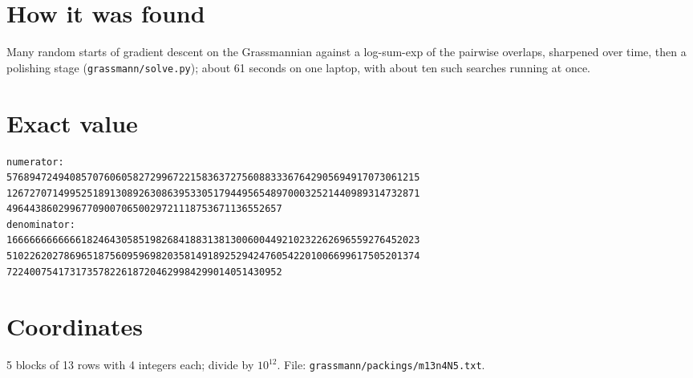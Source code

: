 \documentclass[11pt,a4paper]{article}
\begin{document}
\section{How it was found}
Many random starts of gradient descent on the Grassmannian against a log-sum-exp of the pairwise overlaps, sharpened over time, then a polishing stage (\texttt{grassmann/solve.py}); about 61 seconds on one laptop, with about ten such searches running at once.


\appendix
\section{Exact value}
{\small
\begin{verbatim}
numerator:
576894724940857076060582729967221583637275608833367642905694917073061215
126727071499525189130892630863953305179449565489700032521440989314732871
496443860299677090070650029721118753671136552657
denominator:
166666666666618246430585198268418831381300600449210232262696559276452023
510226202786965187560959698203581491892529424760542201006699617505201374
722400754173173578226187204629984299014051430952
\end{verbatim}}

\section{Coordinates}
5 blocks of 13 rows with 4 integers each; divide by $10^{12}$. File: \texttt{grassmann/packings/m13n4N5.txt}.
{\tiny
\begin{multicols}{3}
\end{multicols}}
\end{document}
